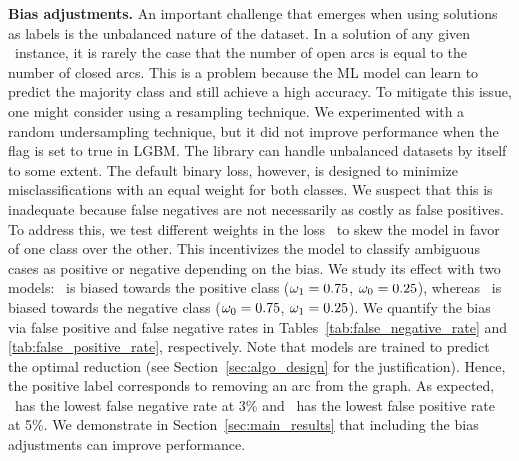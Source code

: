 \documentclass[3p, authoryear, times, doubleblind]{elsarticle}
\begin{document}
{\textbf{Bias adjustments. } 
An important challenge that emerges when using solutions as labels is the unbalanced nature of the dataset. In a solution of any given \fcn\ instance, it is rarely the case that the number of open arcs is equal to the number of closed arcs. This is a problem because the ML model can learn to predict the majority class and still achieve a high accuracy. To mitigate this issue, one might consider using a resampling technique.  We experimented with a random undersampling technique, but it did not improve performance when the flag  is set to true in LGBM. The library can handle unbalanced datasets by itself to some extent. The default binary loss, however, is designed to minimize misclassifications with an equal weight for both classes. We suspect that this is inadequate because false negatives are not necessarily as costly as false positives. To address this, we test different weights in the loss~ to skew the model in favor of one class over the other.  This incentivizes the model to classify ambiguous cases as positive or negative depending on the bias. We study its effect with two models: \lgbma\ is biased towards the positive class ($\omega_1 = 0.75$, $\omega_0=0.25$), whereas \lgbmb\ is biased towards the negative class ($\omega_0 = 0.75$, $\omega_1=0.25$). We quantify the bias via false positive and false negative rates in Tables~\ref{tab:false_negative_rate} and \ref{tab:false_positive_rate}, respectively. Note that models are trained to predict the optimal reduction (see Section~\ref{sec:algo_design} for the justification). Hence, the positive label corresponds to removing an arc from the graph. As expected, \lgbma\ has the lowest false negative rate at 3\% and  \lgbmb\ has the lowest false positive rate at 5\%. We demonstrate in Section~\ref{sec:main_results} that including the bias adjustments can improve performance. 




}
\end{document}
